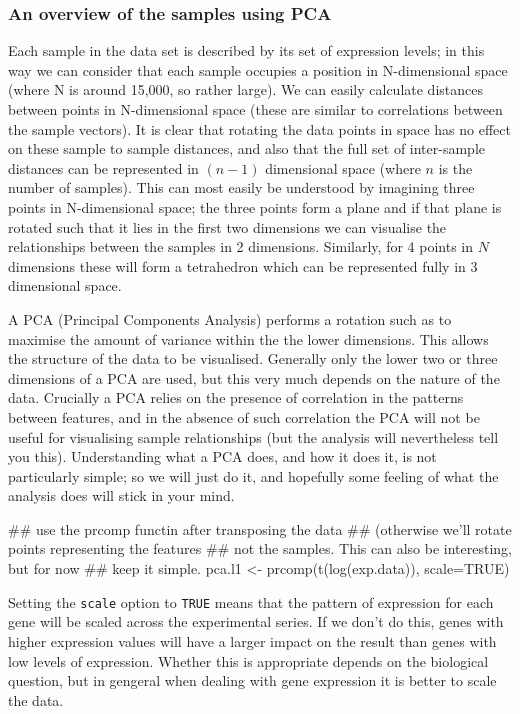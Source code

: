 \documentclass[11pt]{article}
\begin{document}
\subsubsection{An overview of the samples using PCA}
\label{sec-1-3-2}
Each sample in the data set is described by its set of expression levels; in this way we
can consider that each sample occupies a position in N-dimensional space (where N is
around 15,000, so rather large). We can easily calculate distances between points in
N-dimensional space (these are similar to correlations between the sample vectors). It
is clear that rotating the data points in space has no effect on these sample to
sample distances, and also that the full set of inter-sample distances can be represented
in $(n-1)$ dimensional space (where $n$ is the number of samples). This can most easily
be understood by imagining three points in N-dimensional space; the three points form
a plane and if that plane is rotated such that it lies in the first two dimensions
we can visualise the relationships between the samples in 2 dimensions. Similarly,
for 4 points in $N$ dimensions these will form a tetrahedron which can be represented
fully in 3 dimensional space.

A PCA (Principal Components Analysis) performs a rotation such as to maximise the
amount of variance within the the lower dimensions. This allows the structure of
the data to be visualised. Generally only the lower two or three dimensions of a
PCA are used, but this very much depends on the nature of the data. Crucially a PCA
relies on the presence of correlation in the patterns between features, and in
the absence of such correlation the PCA will not be useful for visualising sample
relationships (but the analysis will nevertheless tell you this). Understanding
what a PCA does, and how it does it, is not particularly simple; so we will just
do it, and hopefully some feeling of what the analysis does will stick in your mind.

\begin{rcode}
  ## use the prcomp functin after transposing the data
  ## (otherwise we'll rotate points representing the features
  ## not the samples. This can also be interesting, but for now
  ## keep it simple.
  pca.l1 <- prcomp(t(log(exp.data)), scale=TRUE)
\end{rcode}

Setting the \texttt{scale} option to \texttt{TRUE} means that the pattern
of expression for each gene will be scaled across the experimental series.
If we don't do this, genes with higher expression values will have a larger
impact on the result than genes with low levels of expression. Whether this is
appropriate depends on the biological question, but in gengeral when dealing
with gene expression it is better to scale the data.
\end{document}
